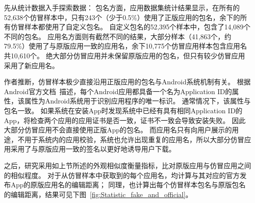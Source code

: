 
先从统计数据入手探索数据：
包名方面，应用数据集统计结果显示，在所有的52,638个仿冒样本中，只有243个（少于0.5\%）使用了正版应用的包名，余下的所有仿冒样本都使用了自定义包名。
自定义包名的52,395个样本中，包含了14,089个不同的包名。
应用名方面则有截然不同的结果，大部分样本（41,863个，约79.5\%）使用了与原版应用一致的应用名，余下10,775个仿冒应用样本包含应用名共10,610个。
绝大部分仿冒应用并未保留原版应用的包名，但只有较少仿冒应用采用了新应用名。

作者推断，仿冒样本极少直接沿用正版应用的包名与Android系统机制有关。
根据Android官方文档~\cite{setAppId}描述，每个Android应用都具备一个名为Application ID的属性，该属性为Android系统用于识别应用程序的唯一标识。
通常情况下，该属性与包名一致。
如果系统在安装App时发现系统中已经有具有相同Application ID的App，将检查两个应用的应用证书是否一致，证书不一致会导致安装失败。
因此大部分仿冒应用不会直接使用正版App的包名。
而应用名只有向用户展示的用途，不用于系统内的应用校验，系统也允许出现重复的应用名，所以大部分仿冒应用采用了与原版应用一致的签名以更好地诱导用户下载。

之后，研究采用如上节所述的外观相似度衡量指标，比对原版应用与仿冒应用之间的相似程度。
对于从仿冒样本中获取到的每个应用名，均计算与其对应的官方发布App的原版应用名的编辑距离；
同理，也计算出每个仿冒样本包名与原版包名的编辑距离，结果可见下图~\autoref{fig:Statistic_fake_and_official}。

